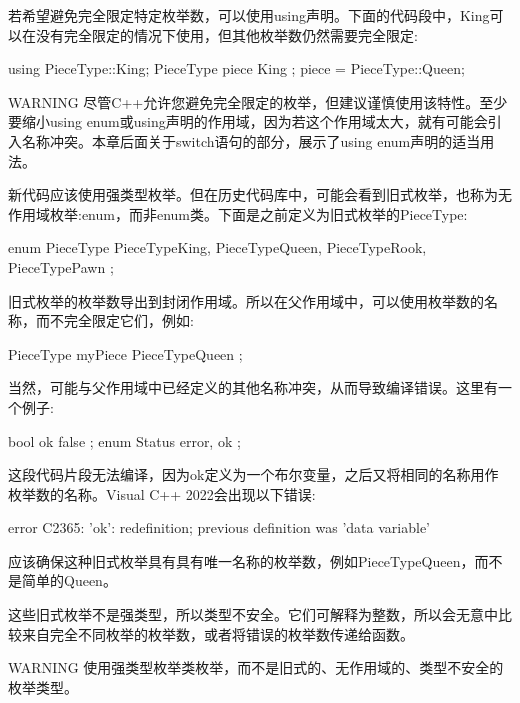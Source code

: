 若希望避免完全限定特定枚举数，可以使用using声明。下面的代码段中，King可以在没有完全限定的情况下使用，但其他枚举数仍然需要完全限定:

\begin{cpp}
using PieceType::King;
PieceType piece { King };
piece = PieceType::Queen;
\end{cpp}

\begin{myWarning}{WARNING}
尽管C++允许您避免完全限定的枚举，但建议谨慎使用该特性。至少要缩小using enum或using声明的作用域，因为若这个作用域太大，就有可能会引入名称冲突。本章后面关于switch语句的部分，展示了using enum声明的适当用法。
\end{myWarning}


新代码应该使用强类型枚举。但在历史代码库中，可能会看到旧式枚举，也称为无作用域枚举:enum，而非enum类。下面是之前定义为旧式枚举的PieceType:

\begin{cpp}
enum PieceType { PieceTypeKing, PieceTypeQueen, PieceTypeRook, PieceTypePawn };
\end{cpp}

旧式枚举的枚举数导出到封闭作用域。所以在父作用域中，可以使用枚举数的名称，而不完全限定它们，例如:

\begin{cpp}
PieceType myPiece { PieceTypeQueen };
\end{cpp}

当然，可能与父作用域中已经定义的其他名称冲突，从而导致编译错误。这里有一个例子:

\begin{cpp}
bool ok { false };
enum Status { error, ok };
\end{cpp}

这段代码片段无法编译，因为ok定义为一个布尔变量，之后又将相同的名称用作枚举数的名称。Visual C++ 2022会出现以下错误:

\begin{shell}
error C2365: 'ok': redefinition; previous definition was 'data variable'
\end{shell}

应该确保这种旧式枚举具有具有唯一名称的枚举数，例如PieceTypeQueen，而不是简单的Queen。

这些旧式枚举不是强类型，所以类型不安全。它们可解释为整数，所以会无意中比较来自完全不同枚举的枚举数，或者将错误的枚举数传递给函数。

\begin{myWarning}{WARNING}
使用强类型枚举类枚举，而不是旧式的、无作用域的、类型不安全的枚举类型。
\end{myWarning}

